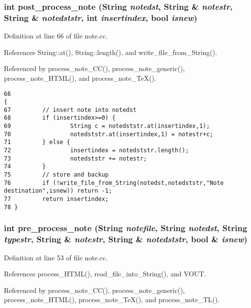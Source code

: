 \subsubsection{\setlength{\rightskip}{0pt plus 5cm}int post\_\-process\_\-note ({\bf String} {\em notedst}, {\bf String} \& {\em notestr}, {\bf String} \& {\em notedststr}, int {\em insertindex}, bool {\em isnew})}\label{note_8cc_a2}




Definition at line 66 of file note.cc.

References String::at(), String::length(), and write\_\-file\_\-from\_\-String().

Referenced by process\_\-note\_\-CC(), process\_\-note\_\-generic(), process\_\-note\_\-HTML(), and process\_\-note\_\-Te\-X().



\footnotesize\begin{verbatim}66                                                                                                           {
67         // insert note into notedst
68         if (insertindex>=0) {
69                 String c = notedststr.at(insertindex,1);
70                 notedststr.at(insertindex,1) = notestr+c;
71         } else {
72                 insertindex = notedststr.length();
73                 notedststr += notestr;
74         }
75         // store and backup
76         if (!write_file_from_String(notedst,notedststr,"Note destination",isnew)) return -1;
77         return insertindex;
78 }
\end{verbatim}\normalsize 
{}
\subsubsection{\setlength{\rightskip}{0pt plus 5cm}int pre\_\-process\_\-note ({\bf String} {\em notefile}, {\bf String} {\em notedst}, {\bf String} {\em typestr}, {\bf String} \& {\em notestr}, {\bf String} \& {\em notedststr}, bool \& {\em isnew})}\label{note_8cc_a1}




Definition at line 53 of file note.cc.

References process\_\-HTML(), read\_\-file\_\-into\_\-String(), and VOUT.

Referenced by process\_\-note\_\-CC(), process\_\-note\_\-generic(), process\_\-note\_\-HTML(), process\_\-note\_\-Te\-X(), and process\_\-note\_\-TL().



